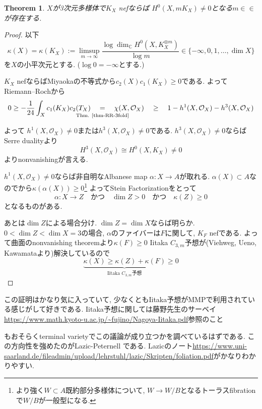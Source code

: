 \documentclass[dvipdfmx,a4paper,11pt]{article} %
\newtheorem{thm}{Theorem}[section]
\theoremstyle{definition}
\theoremstyle{remark}
\numberwithin{equation}{section}
\newcommand{\underalign}[2]{\quad \underset{\mathclap{\strut #1}}{#2}\quad}
\newcommand{\C}{\mathbb{C}}
\begin{document}
\begin{thm}\cite{Miy87}\cite{Miy88a}
$X$が3次元多様体で$K_X$ nefならば
$H^0(X, mK_X) \neq 0$となる$m \in \in$が存在する. 
\end{thm}
\begin{proof}
以下
$$
\kappa(X)=\kappa(K_X)
:= \limsup_{ m \to \infty}\frac{\log \dim_\C H^0(X, K_X^{\otimes m})}{\log m} 
\in \{ - \infty, 0, 1, \ldots, \dim X\}
$$
を$X$の小平次元とする. ($\log 0=-\infty$とする.)


$K_X$ nefならばMiyaokaの不等式から$c_2(X)c_1(K_X)\ge 0$である. 
よってRiemann--Rochから
\[
0 \ge 
-\frac{1}{24}\int_X c_1(K_X)c_2(T_X)
\underalign{\text{Thm. \ref{thm-RR-3fold}}}{=}
\chi(X,\mathcal O_X)
\underalign{}{\ge}
1-h^1(X, \mathcal O_X) -h^3(X, \mathcal O_X) 
\]
よって
$h^1(X, \mathcal O_X)\neq0$または$h^3(X, \mathcal O_X)\neq0$である. 
$h^3(X, \mathcal O_X)\neq0$ならばSerre dualityより
$$
H^3(X, \mathcal O_X) \cong H^0(X, K_X) \neq0
$$
よりnonvanishingが言える. 

$h^1(X, \mathcal O_X)\neq0$ならば非自明なAlbanese map
$\alpha : X \to A$が取れる. 
$\alpha(X) \subset A$なので\cite[Theorem 10.9]{Uen75}から$\kappa(\alpha(X))\ge 0$\footnote{より強く$W \subset A$既約部分多様体について, $W \to W/B$となるトーラスfibrationで$W/B$が一般型になる. }
よってStein Factorizationをとって
$$\alpha : X \to Z
\quad \text{かつ} \quad
\dim Z >0\quad \text{かつ} \quad
\kappa(Z) \ge 0
$$となるものがある. 

あとは$\dim Z$による場合分け. 
$\dim Z=\dim X$ならば明らか. 
$0 < \dim Z <  \dim X=3$の場合, $\alpha$のファイバーは$F$に関して, $K_F$ nefである. 
よって曲面のnonvanishing theoremより$\kappa(F)\ge 0$
Iitaka $C_{3, m}$予想が(Viehweg, Ueno, Kawamataより)解決しているので
$$
\underbrace{\kappa(X) \ge \kappa(Z) + \kappa(F)}_{\text{Iitaka $C_{3, m}$予想}}
 \ge 0
$$
\end{proof}
この証明はかなり気に入っていて, 少なくともIitaka予想がMMPで利用されている感じがして好きである. 
Iitaka予想に関しては藤野先生のサーベイ\url{https://www.math.kyoto-u.ac.jp/~fujino/Nagoya-Iitaka.pdf}参照のこと

\cite{Miy88a}もおそらくterminal varietyでこの議論が成り立つかを調べているはずである. 
この方向性を強めたのがLazic-Peternell \cite{LP18}である. 
Lazicのノート\url{https://www.uni-saarland.de/fileadmin/upload/lehrstuhl/lazic/Skripten/foliation.pdf}がかなりわかりやすい. 
\end{document}
